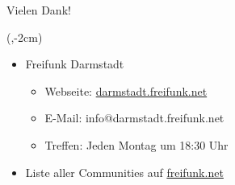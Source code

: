\documentclass[t]{beamer}
\begin{document}

  \begin{frame}{Vielen Dank!}
    \begin{textblock*}{0cm}(\textwidth-2cm,-2cm)
      \begin{figure}[h]
        \def\svgwidth{2.5cm}
        
      \end{figure}
    \end{textblock*}
    \begin{itemize}
      \item Freifunk Darmstadt
      \begin{itemize}
        \item Webseite: \href{http://darmstadt.freifunk.net/}{darmstadt.freifunk.net}
        \item E-Mail: info@darmstadt.freifunk.net
        \item Treffen: Jeden Montag um 18:30 Uhr
      \end{itemize}
      \vspace{1em}
      \item Liste aller Communities auf \href{https://freifunk.net/}{freifunk.net}
    \end{itemize}
  \end{frame}
\end{document}
